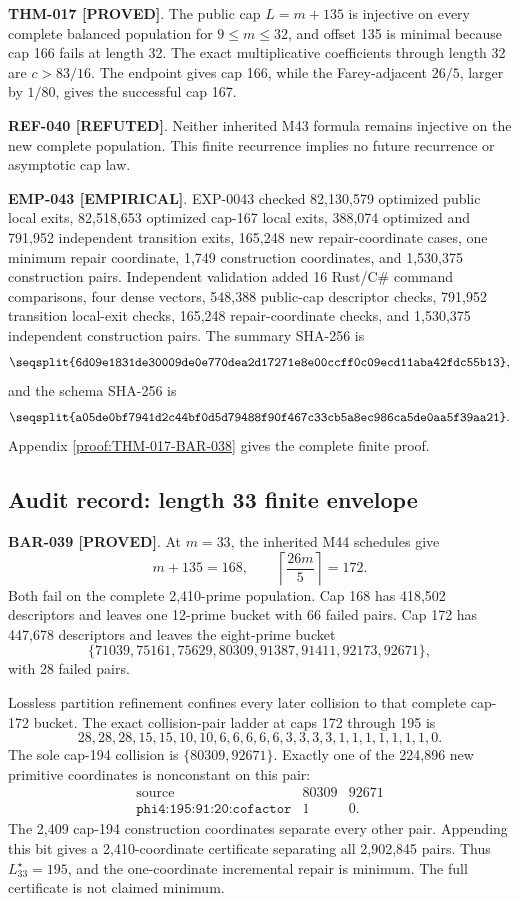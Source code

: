 \documentclass[11pt]{article}
\newcommand{\claimstatus}[2]{\textbf{#1 [#2]}}
\begin{document}
\claimstatus{THM-017}{PROVED}. The public cap \(L=m+135\) is injective on
every complete balanced population for \(9\le m\le32\), and offset 135 is
minimal because cap 166 fails at length 32. The exact multiplicative
coefficients through length 32 are \(c>83/16\). The endpoint gives cap 166,
while the Farey-adjacent \(26/5\), larger by \(1/80\), gives the successful
cap 167.

\claimstatus{REF-040}{REFUTED}. Neither inherited M43 formula remains
injective on the new complete population. This finite recurrence implies no
future recurrence or asymptotic cap law.

\claimstatus{EMP-043}{EMPIRICAL}. EXP-0043 checked 82,130,579 optimized
public local exits, 82,518,653 optimized cap-167 local exits, 388,074
optimized and 791,952 independent transition exits, 165,248 new
repair-coordinate cases, one minimum repair coordinate, 1,749 construction
coordinates, and 1,530,375 construction pairs. Independent validation added
16 Rust/C\# command comparisons, four dense vectors, 548,388 public-cap
descriptor checks, 791,952 transition local-exit checks, 165,248
repair-coordinate checks, and 1,530,375 independent construction pairs. The
summary SHA-256 is
\[
\texttt{\seqsplit{6d09e1831de30009de0e770dea2d17271e8e00ccff0c09ecd11aba42fdc55b13}},
\]
and the schema SHA-256 is
\[
\texttt{\seqsplit{a05de0bf7941d2c44bf0d5d79488f90f467c33cb5a8ec986ca5de0aa5f39aa21}}.
\]
Appendix \ref{proof:THM-017-BAR-038} gives the complete finite proof.

\subsection{Audit record: length 33 finite envelope}

\claimstatus{BAR-039}{PROVED}. At \(m=33\), the inherited M44 schedules give
\[
m+135=168,\qquad
\left\lceil\frac{26m}{5}\right\rceil=172.
\]
Both fail on the complete 2,410-prime population. Cap 168 has 418,502
descriptors and leaves one 12-prime bucket with 66 failed pairs. Cap 172 has
447,678 descriptors and leaves the eight-prime bucket
\[
\{71039,75161,75629,80309,91387,91411,92173,92671\},
\]
with 28 failed pairs.

Lossless partition refinement confines every later collision to that complete
cap-172 bucket. The exact collision-pair ladder at caps 172 through 195 is
\[
28,28,28,15,15,10,10,6,6,6,6,6,3,3,3,3,1,1,1,1,1,1,1,0.
\]
The sole cap-194 collision is \(\{80309,92671\}\). Exactly one of the
224,896 new primitive coordinates is nonconstant on this pair:
\[
\begin{array}{c|rr}
\text{source}&80309&92671\\
\hline
\texttt{phi4:195:91:20:cofactor}&1&0.
\end{array}
\]
The 2,409 cap-194 construction coordinates separate every other pair.
Appending this bit gives a 2,410-coordinate certificate separating all
2,902,845 pairs. Thus \(L_{33}^{\star}=195\), and the one-coordinate
incremental repair is minimum. The full certificate is not claimed minimum.
\end{document}

